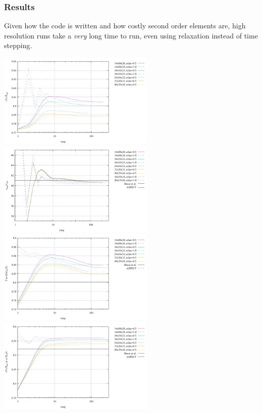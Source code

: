 \newpage
\subsubsection*{Results}

Given how the code is written and how costly second order elements are, high resolution
runs take a {\it very} long time to run, even using relaxation instead of time stepping. 

\begin{center}
\includegraphics[width=7.5cm]{python_codes/fieldstone_20/results/Tavrg.pdf}\\
\includegraphics[width=7.5cm]{python_codes/fieldstone_20/results/vrms.pdf}
\includegraphics[width=7.5cm]{python_codes/fieldstone_20/results/Tmid.pdf}\\
\includegraphics[width=7.5cm]{python_codes/fieldstone_20/results/Tm.pdf}

\end{center}
